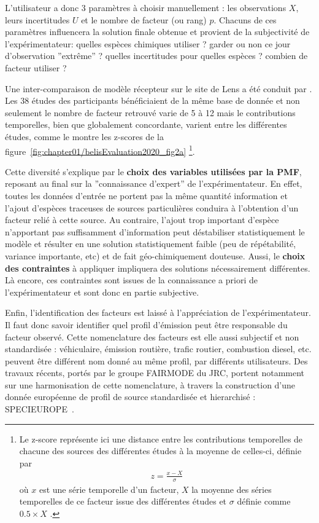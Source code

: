 L'utilisateur a donc 3 paramètres à choisir manuellement : les observations $X$, leurs
incertitudes $U$ et le nombre de facteur (ou rang) $p$. Chacuns de ces paramètres
influencera la solution finale obtenue et provient de la subjectivité de l'expérimentateur:
quelles espèces chimiques utiliser ? garder ou non ce jour d'observation ''extrême'' ?
quelles incertitudes pour quelles espèces ? combien de facteur utiliser ?

Une inter-comparaison de modèle récepteur sur le site de Lens a été conduit par
\textcite{belisEvaluation2020}. Les 38 études des participants bénéficiaient de
la même base de donnée et non seulement le nombre de facteur retrouvé varie de 5 à 12 mais 
le contributions temporelles, bien que globalement concordante, varient entre les
différentes études, comme le montre les z-scores de la figure~\ref{fig:chapter01/belisEvaluation2020_fig2a}
\footnote{Le z-score représente ici une distance entre les contributions temporelles de
    chacune des sources des différentes études à la moyenne de celles-ci, définie par 
    \begin{align}
        \label{eq:z-score}
        z = \frac{x-X}{\sigma}
    \end{align}
    où $x$ est une série temporelle d'un facteur, $X$ la moyenne des séries temporelles de
    ce facteur issue des différentes études et $\sigma$ définie comme $0.5\times X$
    \parencite{pernigottiDeltaSA2018}.
}.

Cette diversité s'explique par le \textbf{choix des variables utilisées par la PMF}, reposant au
final sur la ''connaissance d'expert'' de l'expérimentateur. En effet, toutes les données
d'entrée ne portent pas la même quantité information et l'ajout d'espèces traceuses de
sources particulières conduira à l'obtention d'un facteur relié à cette source. Au
contraire, l'ajout trop important d'espèce n'apportant pas suffisamment d'information peut
déstabiliser statistiquement le modèle et résulter en une solution statistiquement faible
(peu de répétabilité, variance importante, etc) et de fait géo-chimiquement douteuse.
Aussi, le \textbf{choix des contraintes} à appliquer impliquera des solutions
nécessairement différentes. Là encore, ces contraintes sont issues de la connaissance a
priori de l'expérimentateur et sont donc en partie subjective.

Enfin, l'identification des facteurs est laissé à l'appréciation de l'expérimentateur. Il
faut donc savoir identifier quel profil d'émission peut être responsable du facteur
observé. Cette nomenclature des facteurs est elle aussi subjectif et non standardisée :
véhiculaire, émission routière, trafic routier, combustion diesel, etc. peuvent être
différent nom donné au même profil, par différents utilisateurs.
Des travaux récents, portés par le groupe FAIRMODE du JRC, portent notamment sur une
harmonisation de cette nomenclature, à travers la construction d'une donnée européenne de
profil de source standardisée et hierarchisé : SPECIEUROPE~\autocite{pernigottiSPECIEUROPE2016}.

